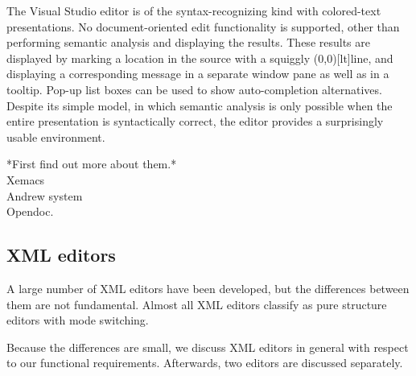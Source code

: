 \documentclass{entcs}
\begin{document}
The Visual Studio editor is of the syntax-recognizing kind with colored-text presentations. No document-oriented edit functionality is supported, other than performing semantic analysis and displaying the results. These results are displayed by marking a location in the source with a squiggly \makebox(0,0)[lt]{}line, and displaying a corresponding message in a separate window pane as well as in a tooltip. Pop-up list boxes can be used to show auto-completion alternatives. Despite its simple model, in which semantic analysis is only possible when the entire presentation is syntactically correct, the editor provides a surprisingly usable environment. 

\bc
\toHere     %


*First find out more about them.*\\
Xemacs\\
Andrew system\\
Opendoc.\\

\fromHere  %


\ec

%																
\subsection{XML editors} \label{sect:xmlEditors}

A large number of XML editors have been developed, but the differences between them are not fundamental. Almost all XML editors classify as pure structure editors with mode switching. 

Because the differences are small, we discuss XML editors in general with respect to our functional requirements. Afterwards, two  editors are discussed separately.
\end{document}
